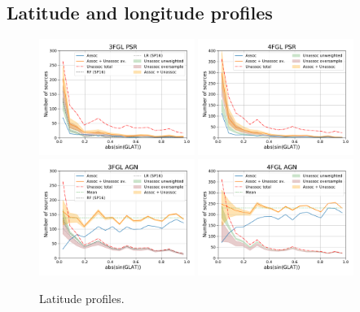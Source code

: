 \subsection{Latitude and longitude profiles}

\begin{figure}[h]
\center
\includegraphics[width=0.45\textwidth]{plots/lat_profile_PSR_3FGL_oversample.pdf}
\includegraphics[width=0.45\textwidth]{plots/lat_profile_PSR_4FGL_oversample.pdf} \\
\includegraphics[width=0.45\textwidth]{plots/lat_profile_AGN_3FGL_oversample.pdf}
\includegraphics[width=0.45\textwidth]{plots/lat_profile_AGN_4FGL_oversample.pdf}
\caption{Latitude profiles.}  
\label{fig:lat_profile}
\end{figure}



